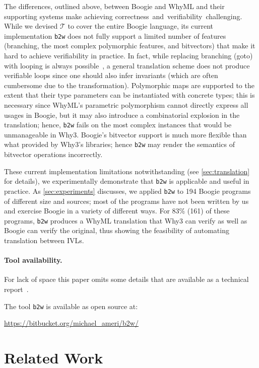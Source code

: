\documentclass[a4paper,final]{llncs}
\makeatletter
\newif\iflong
\newcommand{\tr}{\mathcal{T}}
\newcommand{\btw}{\texttt{b2w}\xspace}
\newcommand{\Boogie}{Boogie\xspace}
\newcommand{\WhyML}{WhyML\xspace}
\newcommand{\Why}{Why3\xspace}
\newcommand{\tightParagraph}[1]{\paragraph{#1}}
\newcommand\tightParagraph{\@startsection{paragraph}{4}{\z@}{-5\p@ \@plus -4\p@ \@minus -4\p@}{-0.5em \@plus -0.22em \@minus -0.1em}{\normalfont\normalsize\itshape}}
\makeatother
\begin{document}
The differences, outlined above, between \Boogie and \WhyML and their supporting systems make achieving correctness\iflong,\else\ and\fi\ verifiability\iflong, and readability\fi\ challenging.
While we devised $\tr$ to cover the entire \Boogie language, its current implementation \btw does not fully support a limited number of features (branching, the most complex polymorphic features, and bitvectors) that make it hard to achieve verifiability in practice.
In fact, while replacing branching (goto) with looping is always possible~\cite{Harel-folk}, a general translation scheme does not produce verifiable loops since one should also infer invariants (which are often cumbersome due to the transformation).
Polymorphic maps are supported to the extent that their type parameters can be instantiated with concrete types; this is necessary since \WhyML's parametric polymorphism cannot directly express all usages in \Boogie, but it may also introduce a combinatorial explosion in the translation; hence, \btw fails on the most complex instances that would be unmanageable in \Why.
\Boogie's bitvector support is much more flexible than what provided by \Why's libraries; hence \btw may render the semantics of bitvector operations incorrectly.

These current implementation limitations notwithstanding (see \autoref{sec:translation} for details), we experimentally demonstrate that \btw is applicable and useful in practice.
As \autoref{sec:experiments} discusses, we applied \btw to 194 \Boogie programs of different size and sources; most of the programs have not been written by us and exercise \Boogie in a variety of different ways.
For 83\% (161) of these programs, \btw produces a \WhyML translation that \Why can verify as well as \Boogie can verify the original, thus showing the feasibility of automating translation between IVLs. 


\tightParagraph{Tool availability.}
\iflong\else
For lack of space this paper omits some details that are available as a technical report~\cite{extended-version}.
\fi
The tool \btw is available as open source at:
\iflong\begin{center} \fi
\url{https://bitbucket.org/michael_ameri/b2w/}
\iflong\end{center}\fi








\section{Related Work}\label{sec:related-work}
\end{document}

